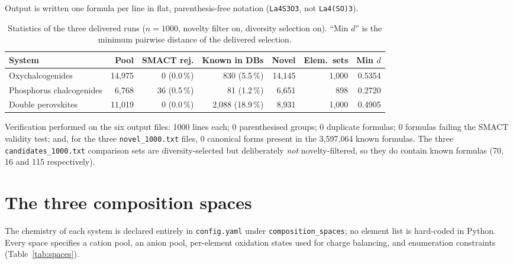 \documentclass[11pt,a4paper]{article}
\newcommand{\code}[1]{\texttt{#1}}
\begin{document}
Output is written one formula per line in flat, parenthesis-free notation
(\code{La4S3O3}, not \code{La4(SO)3}).

\begin{table}[h]
\centering
\footnotesize
\begin{tabular}{@{}lrrrrrr@{}}
\toprule
System & Pool & SMACT rej. & Known in DBs & Novel & Elem.\ sets & Min $d$\\
\midrule
Oxychalcogenides         & 14{,}975 &  0 (0.0\,\%) &   830 (5.5\,\%) & 14{,}145 & 1{,}000 & 0.5354\\
Phosphorus chalcogenides &  6{,}768 & 36 (0.5\,\%) &    81 (1.2\,\%) &  6{,}651 &   898   & 0.2720\\
Double perovskites       & 11{,}019 &  0 (0.0\,\%) & 2{,}088 (18.9\,\%) & 8{,}931 & 1{,}000 & 0.4905\\
\bottomrule
\end{tabular}
\caption{Statistics of the three delivered runs ($n=1000$, novelty filter on, diversity selection on).
``Min $d$'' is the minimum pairwise distance of the delivered selection.}
\label{tab:runs}
\end{table}

Verification performed on the six output files: 1000 lines each; 0 parenthesised groups;
0 duplicate formulas; 0 formulas failing the SMACT validity test; and, for the three
\code{novel\_1000.txt} files, 0 canonical forms present in the 3{,}597{,}064 known formulas.
The three \code{candidates\_1000.txt} comparison sets are diversity-selected but deliberately
\emph{not} novelty-filtered, so they do contain known formulas (70, 16 and 115 respectively).

\section{The three composition spaces}

The chemistry of each system is declared entirely in \code{config.yaml} under
\code{composition\_spaces}; no element list is hard-coded in Python. Every space specifies a
cation pool, an anion pool, per-element oxidation states used for charge balancing, and
enumeration constraints (Table~\ref{tab:spaces}).
\end{document}
